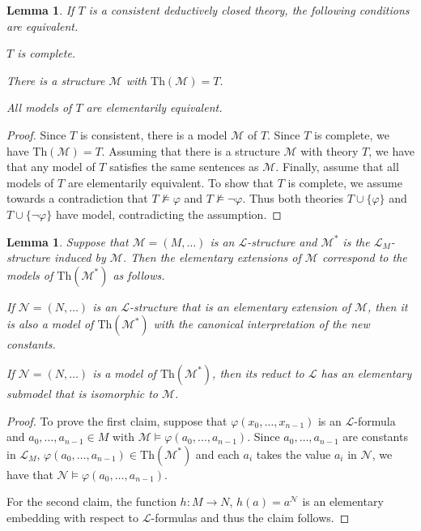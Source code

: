 \documentclass[10pt]{amsart}
\renewcommand{\L}{\mathcal{L}}
\newcommand{\MM}{\mathcal{M}}
\newcommand{\NN}{\mathcal{N}}
\newcommand{\Th}{\mathrm{Th}}
\newtheorem{lemma}[theorem]{Lemma}
\theoremstyle{definition}
\theoremstyle{remark}
\newenvironment{enumerate-(a)}{\begin{enumerate}[label={\upshape (\alph*)}, leftmargin=2pc]}{\end{enumerate}}
\begin{document}
\begin{lemma} 
If $T$ is a consistent deductively closed theory, the following conditions are equivalent. 
\begin{enumerate-(a)} 
\item 
$T$ is complete. 
\item 
There is a structure $\MM$ with $\Th(\MM)=T$. 
\item 
All models of $T$ are elementarily equivalent. 
\end{enumerate-(a)} 
\end{lemma} 
\begin{proof} 
Since $T$ is consistent, there is a model $\MM$ of $T$. Since $T$ is complete, we have $\Th(\MM)=T$. Assuming that there is a structure $\MM$ with theory $T$, we have that any model of $T$ satisfies the same sentences as $\MM$. Finally, assume that all models of $T$ are elementarily equivalent. To show that $T$ is complete, we assume towards a contradiction that $T\not\models\varphi$ and $T\not\models\neg\varphi$. Thus both theories $T\cup\{\varphi\}$ and $T\cup\{\neg\varphi\}$ have model, contradicting the assumption. 
\end{proof} 

\begin{lemma} 
Suppose that $\MM=(M,\dots)$ is an $\L$-structure and $\MM^*$ is the $\L_M$-structure induced by $\MM$. Then the elementary extensions of $\MM$ correspond to the models of $\Th(\MM^*)$ as follows. 
\begin{enumerate-(a)} 
\item 
If $\NN=(N,\dots)$ is an $\L$-structure that is an elementary extension of $\MM$, then it is also a model of $\Th(\MM^*)$ with the canonical interpretation of the new constants. 
\item 
If $\NN=(N,\dots)$ is a model of $\Th(\MM^*)$, then its reduct to $\L$ has an elementary submodel that is isomorphic to $\MM$. 
\end{enumerate-(a)} 
\end{lemma} 
\begin{proof} 
To prove the first claim, suppose that $\varphi(x_0,\dots,x_{n-1})$ is an $\L$-formula and $a_0,\dots,a_{n-1}\in M$ with $\MM\models \varphi(a_0,\dots,a_{n-1})$. Since $a_0,\dots,a_{n-1}$ are constants in $\L_M$, $\varphi(a_0,\dots,a_{n-1})\in \Th(\MM^*)$ and each $a_i$ takes the value $a_i$ in $\NN$, we have that $\NN\models \varphi(a_0,\dots,a_{n-1})$. 

For the second claim, the function $h\colon M\rightarrow N$, $h(a)=a^{\NN}$ is an elementary embedding with respect to $\L$-formulas and thus the claim follows. 
\end{proof} 
\end{document}

